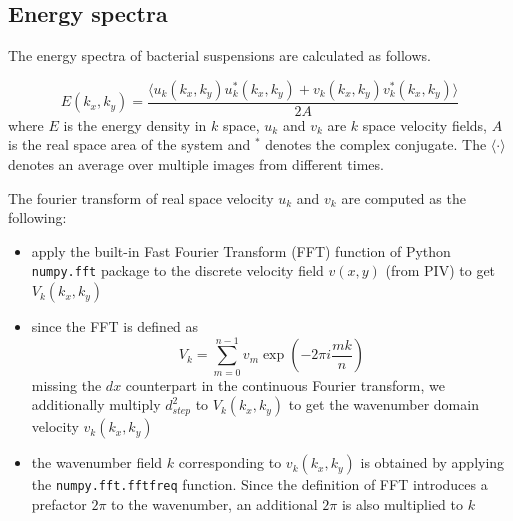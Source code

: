 \documentclass[twocolumn,aps,prx,amsmath,amssymb,longbibliography]{revtex4-2}
\begin{document}
\subsection{Energy spectra}
The energy spectra of bacterial suspensions are calculated as follows.

\begin{equation}
E(k_x, k_y) = \frac{\langle u_k(k_x, k_y)u^*_k(k_x, k_y)+v_k(k_x, k_y)v_k^*(k_x, k_y)\rangle}{2A}
\end{equation}
where $E$ is the energy density in $k$ space, $u_k$ and $v_k$ are $k$ space velocity fields, $A$ is the real space area of the system and $^*$ denotes the complex conjugate. The $\langle\cdot\rangle$ denotes an average over multiple images from different times.

The fourier transform of real space velocity $u_k$ and $v_k$ are computed as the following:
\begin{itemize}
  \item apply the built-in Fast Fourier Transform (FFT) function of Python \texttt{numpy.fft} package to the discrete velocity field $v(x, y)$ (from PIV) to get $V_k(k_x, k_y)$
  \item since the FFT is defined as
    $$
    V_k=\sum^{n-1}_{m=0}v_m\exp(-2\pi i \frac{mk}{n})
    $$
    missing the $dx$ counterpart in the continuous Fourier transform, we additionally multiply $d_{step}^2$ to $V_k(k_x, k_y)$ to get the wavenumber domain velocity $v_k(k_x, k_y)$
  \item the wavenumber field $k$ corresponding to $v_k(k_x, k_y)$ is obtained by applying the \texttt{numpy.fft.fftfreq} function. Since the definition of FFT introduces a prefactor $2\pi$ to the wavenumber, an additional $2\pi$ is also multiplied to $k$
\end{itemize}
\end{document}
